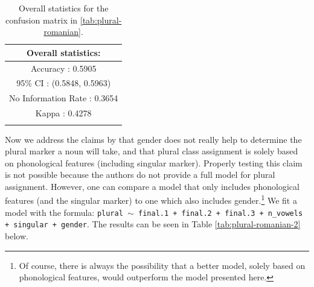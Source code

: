 \begin{table}[!htpb]
  \centering
  \begin{tabular}{c}
    \lsptoprule
    Overall statistics: \\
    \midrule
    Accuracy : 0.5905\\
    95\% CI : (0.5848, 0.5963)\\
    No Information Rate : 0.3654\\
    Kappa : 0.4278\\
    \lspbottomrule
  \end{tabular}
  \caption{Overall statistics for the confusion matrix in \ref{tab:plural-romanian}.}\label{tab:plural-romanian-stats}
\end{table}

Now we address the claims by \textcite{Bateman.2010} that gender does not really help to determine the plural marker a noun will take, and that plural class assignment is solely based on phonological features (including singular marker). Properly testing this claim is not possible because the authors do not provide a full model for plural assignment. However, one can compare a model that only includes phonological features (and the singular marker) to one which also includes gender.\footnote{Of course, there is always the possibility that a better model, solely based on phonological features, would outperform the model presented here.} We fit a model with the formula: \texttt{plural $\sim$ final.1 + final.2 + final.3 + n\_vowels + singular + gender}. The results can be seen in Table \ref{tab:plural-romanian-2} below.

